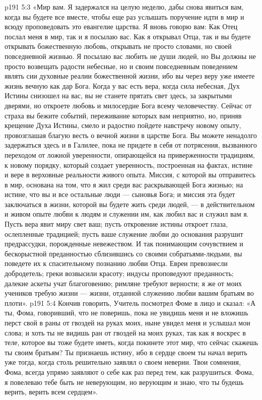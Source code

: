 \vs p191 5:3 «Мир вам. Я задержался на целую неделю, дабы снова явиться вам, когда вы будете все вместе, чтобы еще раз услышать поручение идти в мир и всюду проповедовать это евангелие царства. Я вновь говорю вам: Как Отец послал меня в мир, так и я посылаю вас. Как я открывал Отца, так и вы будете открывать божественную любовь, открывать не просто словами, но своей повседневной жизнью. Я посылаю вас любить не души людей, но  Вы должны не просто возвещать радости небесные, но и своим повседневным поведением являть сии духовные реалии божественной жизни, ибо вы через веру уже имеете жизнь вечную как дар Бога. Когда у вас есть вера, когда сила небесная, Дух Истины снизошел на вас, вы не станете прятать свет здесь, за закрытыми дверями, но откроете любовь и милосердие Бога всему человечеству. Сейчас от страха вы бежите событий, переживание которых вам неприятно, но, приняв крещение Духа Истины, смело и радостно пойдете навстречу новому опыту, провозглашая благую весть о вечной жизни в царстве Бога. Вы можете ненадолго задержаться здесь и в Галилее, пока не придете в себя от потрясения, вызванного переходом от ложной уверенности, опирающейся на приверженности традициям, к новому порядку, который создает уверенность, построенная на фактах, истине и вере в верховные реальности живого опыта. Миссия, с которой вы отправитесь в мир, основана на том, что я жил среди вас раскрывающей Бога жизнью; на истине, что вы и все остальные люди --- сыновья Бога; и миссия эта будет заключаться в жизни, которой вы будете жить среди людей, --- в действительном и живом опыте любви к людям и служении им, как любил вас и служил вам я. Пусть вера явит миру свет ваш; пусть откровение истины откроет глаза, ослепленные традицией; пусть ваше служение любви до основания разрушит предрассудки, порожденные невежеством. И так понимающим сочувствием и бескорыстной преданностью сблизившись со своими собратьями\hyp{}людьми, вы поведете их к спасительному познанию любви Отца. Евреи превознесли добродетель; греки возвысили красоту; индусы проповедуют преданность; далекие аскеты учат благоговению; римляне требуют верности; я же от моих учеников требую жизни --- жизни, отданной служению любви вашим братьям во плоти».
\vs p191 5:4 Кончив говорить, Учитель посмотрел Фоме в лицо и сказал: «А ты, Фома, говоривший, что не поверишь, пока не увидишь меня и не вложишь перст свой в раны от гвоздей на руках моих, ныне увидел меня и услышал мои слова; и хоть ты не видишь ран от гвоздей на моих руках, так как я воскрес в теле, которое вы тоже будете иметь, когда покинете этот мир, что сейчас скажешь ты своим братьям? Ты признаешь истину, ибо в сердце своем ты начал верить уже тогда, когда столь решительно заявлял о своем неверии. Твои сомнения, Фома, всегда упрямо заявляют о себе как раз перед тем, как разрушиться. Фома, я повелеваю тебе быть не неверующим, но верующим и знаю, что ты будешь верить, верить всем сердцем».
